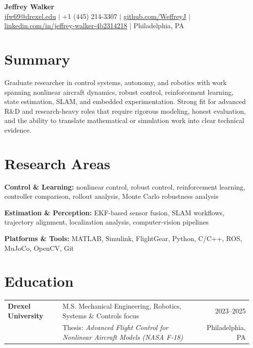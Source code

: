\documentclass[10pt,letterpaper]{article}
\begin{document}
\begin{center}
    {\LARGE \textbf{Jeffrey Walker}}\\[0.28em]
    \href{mailto:jfw69@drexel.edu}{jfw69@drexel.edu}
    \quad $|$ \quad
    +1 (445) 214-3307
    \quad $|$ \quad
    \href{https://github.com/WeffreyJ}{github.com/WeffreyJ}
    \quad $|$ \quad
    \href{https://www.linkedin.com/in/jeffrey-walker-4b2314218/}{linkedin.com/in/jeffrey-walker-4b2314218}
    \quad $|$ \quad
    Philadelphia, PA
\end{center}

\section*{Summary}

Graduate researcher in control systems, autonomy, and robotics with work spanning nonlinear aircraft dynamics, robust control, reinforcement learning, state estimation, SLAM, and embedded experimentation. Strong fit for advanced R\&D and research-heavy roles that require rigorous modeling, honest evaluation, and the ability to translate mathematical or simulation work into clear technical evidence.

\section{Research Areas}

\textbf{Control \& Learning:} nonlinear control, robust control, reinforcement learning, controller comparison, rollout analysis, Monte Carlo robustness analysis

\textbf{Estimation \& Perception:} EKF-based sensor fusion, SLAM workflows, trajectory alignment, localization analysis, computer-vision pipelines

\textbf{Platforms \& Tools:} MATLAB, Simulink, FlightGear, Python, C/C++, ROS, MuJoCo, OpenCV, Git

\section{Education}

\begin{tabularx}{\textwidth}{@{}l Y r@{}}
\textbf{Drexel University} & M.S. Mechanical Engineering, Robotics, Systems \& Controls focus & 2023--2025 \\
& Thesis: \textit{Advanced Flight Control for Nonlinear Aircraft Models (NASA F-18)} & Philadelphia, PA
\end{tabularx}
\end{document}
